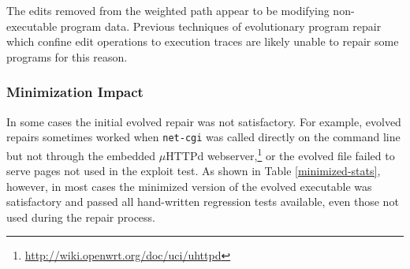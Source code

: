 \documentclass{sigcomm-alternate}
\begin{document}
The edits removed from the weighted path appear to be modifying
non-executable program data.  Previous techniques of evolutionary
program repair which confine edit operations to execution traces are
likely unable to repair some programs for this reason.

\subsubsection{Minimization Impact}
\label{minimization}

In some cases the initial evolved repair was not satisfactory.  For
example, evolved repairs sometimes worked when \texttt{net-cgi} was
called directly on the command line but not through the embedded
$\mu$HTTPd webserver,\footnote{\url{http://wiki.openwrt.org/doc/uci/uhttpd}}
or the evolved file failed to serve pages not used in the
exploit test.  As shown in Table \ref{minimized-stats}, however, in most
cases the minimized version of the evolved executable was satisfactory
and passed all hand-written regression tests available, even those not used
during the repair process. 
\end{document}
